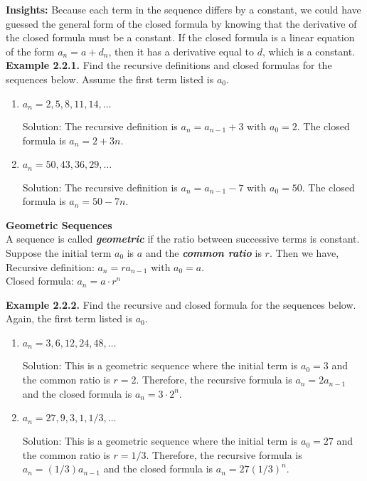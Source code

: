 \documentclass{article}
\begin{document}
	\noindent \textbf{Insights:} Because each term in the sequence differs by a constant, we could have guessed the general form of the closed formula by knowing that the derivative of the closed formula must be a constant. If the closed formula is a linear equation of the form $a_n = a + d_n$, then it has a derivative equal to $d$, which is a constant.\\
	
	\noindent\textbf{Example 2.2.1.} Find the recursive definitions and closed formulas for the sequences below. Assume the first term listed is $a_0$.
	
	\begin{enumerate}
	
	\item $a_n = 2, 5, 8, 11, 14, \ldots$
	
	Solution: The recursive definition is $a_n = a_{n-1} + 3$ with $a_0 = 2$. The closed formula is $a_n = 2 + 3n$.
	
	\item $a_n = 50, 43, 36, 29, \ldots$
	
	Solution: The recursive definition is $a_n = a_{n-1} - 7$ with $a_0 = 50$. The closed formula is $a_n = 50 - 7n$.\\
	\end{enumerate}
	
	\begin{tcolorbox}
		\noindent\textbf{Geometric Sequences}\\
		
		A sequence is called \textit{\textbf{geometric}} if the ratio between successive terms is constant. Suppose the initial term $a_0$ is $a$ and the \textit{\textbf{common ratio}} is $r$. Then we have,\\
	
		\noindent Recursive definition: $a_n = ra_{n-1}$ with $a_0 = a$.\\
		
		\noindent Closed formula: $a_n = a\cdot r^n$
	\end{tcolorbox}
	
	\noindent\textbf{Example 2.2.2.} Find the recursive and closed formula for the sequences below. Again, the first term listed is $a_0$.
	
	\begin{enumerate}
		\item $a_n = 3, 6, 12, 24, 48,\ldots$
		
		Solution: This is a geometric sequence where the initial term is $a_0 = 3$ and the common ratio is $r = 2$. Therefore, the recursive formula is $a_n = 2a_{n-1}$ and the closed formula is $a_n = 3\cdot 2^n$.
		
		\item $a_n = 27, 9, 3, 1, 1/3,\ldots$
		
		Solution: This is a geometric sequence where the initial term is $a_0 = 27$ and the common ratio is $r = 1/3$. Therefore, the recursive formula is $a_n = (1/3)a_{n-1}$ and the closed formula is $a_n = 27(1/3)^n$.\\
	\end{enumerate}
	
\end{document}

